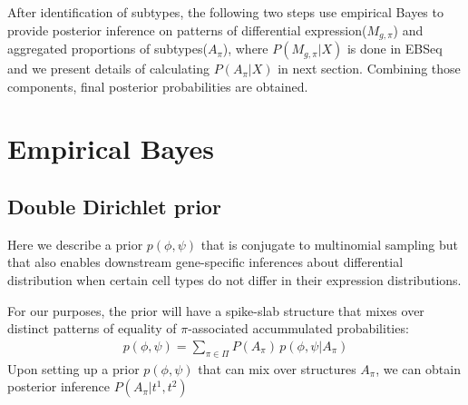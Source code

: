 \documentclass[11pt]{amsart}
\begin{document}
After identification of subtypes, the following two steps use empirical Bayes to provide posterior inference on patterns of differential expression($M_{g,\pi}$) and aggregated proportions of subtypes($A_\pi$), where $P(M_{g,\pi} | X)$ is done in EBSeq\cite{ref:Leng} and we present details of calculating $P(A_\pi | X)$ in next section. Combining those components, final posterior probabilities are obtained. 


\section{Empirical Bayes}
\subsection{Double Dirichlet prior}

Here we describe a prior $p(\phi,\psi)$ that is conjugate to multinomial
sampling but that also enables downstream gene-specific inferences about
differential distribution when certain 
cell types do not differ in their expression
distributions.  


For our purposes, the prior will have a spike-slab structure that mixes
over distinct patterns of equality of $\pi$-associated
accummulated probabilities:
\begin{eqnarray*}
p(\phi,\psi) = \sum_{\pi \in \Pi} P(A_\pi) \, p(\phi,\psi| A_\pi )
\end{eqnarray*} 
Upon setting up a prior $p(\phi,\psi)$ that can mix over structures
$A_\pi$, we can obtain posterior inference $P(A_\pi | t^1, t^2)$
\end{document}
